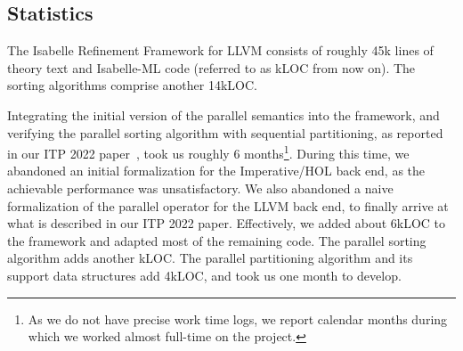 \documentclass[sn-mathphys,Numbered]{sn-jnl}
\theoremstyle{thmstyleone}%
\theoremstyle{definition}%
\theoremstyle{thmstylethree}%
\begin{document}
    \subsection{Statistics}
    The Isabelle Refinement Framework for LLVM consists of roughly 45k lines of theory text and Isabelle-ML code (referred to as kLOC from now on). The sorting algorithms comprise another 14kLOC.

    Integrating the initial version of the parallel semantics into the framework, and verifying the parallel sorting algorithm with sequential partitioning, as reported in our ITP 2022 paper~\cite{La22}, took us roughly 6 months\footnote{As we do not have precise work time logs, we report calendar months during which we worked almost full-time on the project.}. During this time, we abandoned an initial formalization for the Imperative/HOL back end, as the achievable performance was unsatisfactory. We also abandoned a naive formalization of the parallel operator for the LLVM back end, to finally arrive at what is described in our ITP 2022 paper. Effectively, we added about 6kLOC to the framework and adapted most of the remaining code. The parallel sorting algorithm adds another kLOC.
    The parallel partitioning algorithm and its support data structures add 4kLOC, and took us one month to develop.

%
%
%
%
%
%
%
%
%
%
%
%
%
%
%
%
%
%
%
%
%
\end{document}
